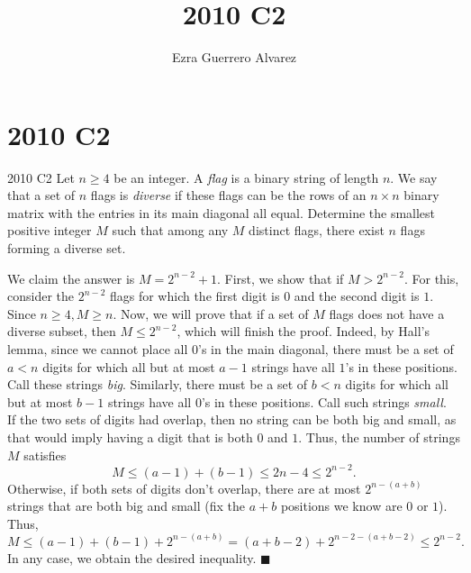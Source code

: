 \documentclass[14pt]{article}
\title{2010 C2}
\author{Ezra Guerrero Alvarez}
\begin{document}
\maketitle
	
\section*{2010 C2}

\begin{statement}{2010 C2}
	Let $n \ge 4$ be an integer.
	A \emph{flag} is a binary string of length $n$.
	We say that a set of $n$ flags is \emph{diverse} if these flags
	can be the rows of an $n \times n$ binary matrix
	with the entries in its main diagonal all equal.
	Determine the smallest positive integer $M$
	such that among any $M$ distinct flags,
	there exist $n$ flags forming a diverse set.
\end{statement}
We claim the answer is $M=2^{n-2}+1$. First, we show that if $M>2^{n-2}$. For this, consider the $2^{n-2}$ flags for which the first digit is $0$ and the second digit is $1$. Since $n\ge4, M\ge n$. Now, we will prove that if a set of $M$ flags does not have a diverse subset, then $M\le 2^{n-2}$, which will finish the proof. Indeed, by Hall's lemma, since we cannot place all $0$'s in the main diagonal, there must be a set of $a<n$ digits for which all but at most $a-1$ strings have all $1$'s in these positions. Call these strings \emph{big}. Similarly, there must be a set of $b<n$ digits for which all but at most $b-1$ strings have all $0$'s in these positions. Call such strings \emph{small}. \\
If the two sets of digits had overlap, then no string can be both big and small, as that would imply having a digit that is both $0$ and $1$. Thus, the number of strings $M$ satisfies
\[M\le (a-1)+(b-1)\le 2n-4\le 2^{n-2}. \]
Otherwise, if both sets of digits don't overlap, there are at most $2^{n-(a+b)}$ strings that are both big and small (fix the $a+b$ positions we know are $0$ or $1$). Thus, 
\[ M\le (a-1)+(b-1)+2^{n-(a+b)}=(a+b-2)+2^{n-2-(a+b-2)}\le 2^{n-2}. \]
In any case, we obtain the desired inequality. $\blacksquare$
	
\end{document}
